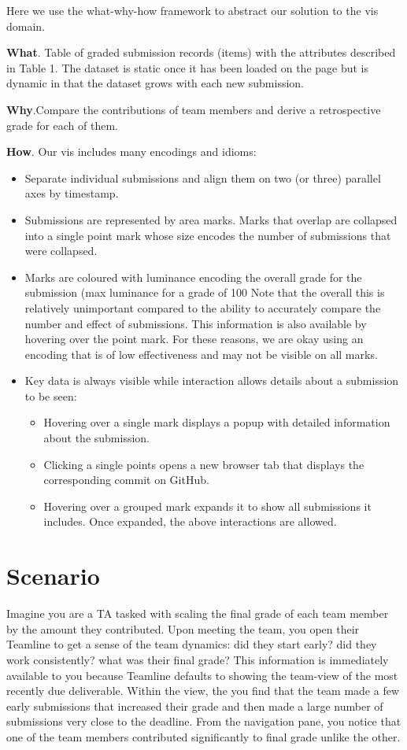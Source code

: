 \documentclass[preprint,journal]{vgtc}       %
\begin{document}
Here we use the what-why-how framework \cite{Munzner:2014} to abstract our solution to the vis domain.

\textbf{What}. Table of graded submission records (items) with the attributes
described in Table 1. The dataset is static once it has been loaded on the page
but is dynamic in that the dataset grows with each new submission.

\textbf{Why}.Compare the contributions of team members and derive a retrospective
grade for each of them.

\textbf{How}. Our vis includes many encodings and idioms:
\begin{itemize}
  \item Separate individual submissions and align them on two (or three)
        parallel axes by timestamp.
  \item Submissions are represented by area marks. Marks that overlap are collapsed into
    a single point mark whose size encodes the number of submissions that were collapsed.
  \item Marks are coloured with luminance encoding the overall grade for the submission (max luminance for a grade of 100%
    Note that the overall this is relatively unimportant compared to the ability to
    accurately compare the number and effect of submissions. This information is also available
    by hovering over the point mark. For these reasons, we are okay using an encoding
    that is of low effectiveness and may not be visible on all marks.
  \item Key data is always visible while interaction allows details about a submission to
    be seen:
    \begin{itemize}
      \item Hovering over a single mark displays a popup with detailed information about the submission.
      \item Clicking a single points opens a new browser tab that displays the corresponding commit on GitHub.
      \item Hovering over a grouped mark expands it to show all submissions it includes. Once expanded,
        the above interactions are allowed.
    \end{itemize}
\end{itemize}

\section{Scenario}
Imagine you are a TA tasked with scaling the final grade of each team member by
the amount they contributed. Upon meeting the team, you open their Teamline to
get a sense of the team dynamics: did they start early? did they work consistently?
what was their final grade? This information is immediately available to you
because Teamline defaults to showing the team-view of the most recently due deliverable.
Within the view, the you find that the team made a few early submissions that
increased their grade and then made a large number of submissions very close to
the deadline. From the navigation pane, you notice that one of the team members
contributed significantly to final grade unlike the other.
\end{document}
